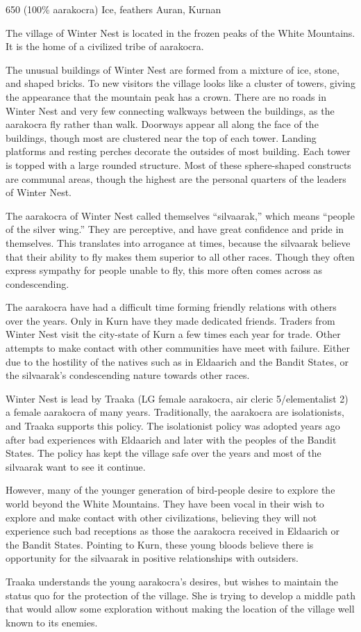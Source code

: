 {650 (100\% aarakocra)}
{Ice, feathers}
{Auran, Kurnan}
{
	The village of Winter Nest is located in the frozen peaks of the White Mountains. It is the home of a civilized tribe of aarakocra.

	The unusual buildings of Winter Nest are formed from a mixture of ice, stone, and shaped bricks. To new visitors the village looks like a cluster of towers, giving the appearance that the mountain peak has a crown. There are no roads in Winter Nest and very few connecting walkways between the buildings, as the aarakocra fly rather than walk. Doorways appear all along the face of the buildings, though most are clustered near the top of each tower. Landing platforms and resting perches decorate the outsides of most building. Each tower is topped with a large rounded structure. Most of these sphere-shaped constructs are communal areas, though the highest are the personal quarters of the leaders of Winter Nest.
}
{
	The aarakocra of Winter Nest called themselves ``silvaarak,'' which means ``people of the silver wing.'' They are perceptive, and have great confidence and pride in themselves. This translates into arrogance at times, because the silvaarak believe that their ability to fly makes them superior to all other races. Though they often express sympathy for people unable to fly, this more often comes across as condescending.

	The aarakocra have had a difficult time forming friendly relations with others over the years. Only in Kurn have they made dedicated friends. Traders from Winter Nest visit the city-state of Kurn a few times each year for trade. Other attempts to make contact with other communities have meet with failure. Either due to the hostility of the natives such as in Eldaarich and the Bandit States, or the silvaarak's condescending nature towards other races.
}
{
	Winter Nest is lead by Traaka (LG female aarakocra, air cleric 5/elementalist 2) a female aarakocra of many years. Traditionally, the aarakocra are isolationists, and Traaka supports this policy. The isolationist policy was adopted years ago after bad experiences with Eldaarich and later with the peoples of the Bandit States. The policy has kept the village safe over the years and most of the silvaarak want to see it continue.

	However, many of the younger generation of bird-people desire to explore the world beyond the White Mountains. They have been vocal in their wish to explore and make contact with other civilizations, believing they will not experience such bad receptions as those the aarakocra received in Eldaarich or the Bandit States. Pointing to Kurn, these young bloods believe there is opportunity for the silvaarak in positive relationships with outsiders.

	Traaka understands the young aarakocra's desires, but wishes to maintain the status quo for the protection of the village. She is trying to develop a middle path that would allow some exploration without making the location of the village well known to its enemies.
}

